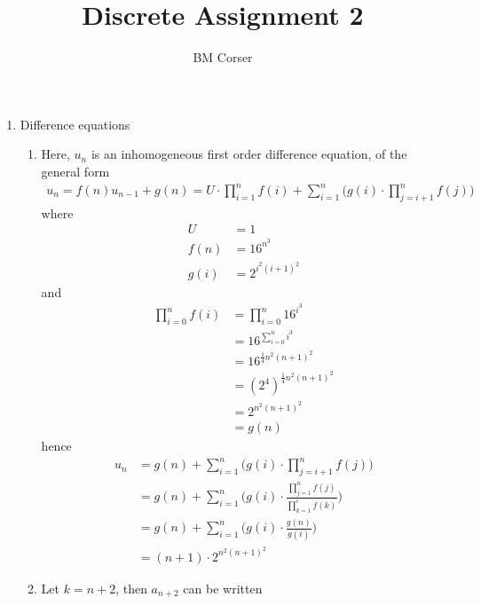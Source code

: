 \documentclass[10pt]{article}
\author{BM Corser}
\title{Discrete Assignment 2}
\begin{document}
    \maketitle 
    \begin{enumerate}
        \item Difference equations
        \begin{enumerate}
            \item Here, $u_n$ is an inhomogeneous first order difference
                equation, of the general form
                \begin{align*}
                    u_n = f(n)u_{n - 1} + g(n)
                        = U \cdot \prod_{i = 1}^n f(i) + \sum_{i = 1}^n\Bigg(g(i) \cdot \prod_{j = i + 1}^n f(j) \Bigg)
                \end{align*}
                where
                \begin{align*}
                    U &= 1 \\
                    f(n) &= 16^{n^3} \\
                    g(i) &= 2^{i^2(i + 1)^2}
                \end{align*}
                and
                \begin{align*}
                    \prod_{i = 0}^nf(i) &= \prod_{i = 0}^n16^{i^3} \\
                     &= 16^{\sum_{i = 0}^ni^3} \\
                     &= 16^{\frac{1}{4}n^2(n + 1)^2} \\
                     &= (2^4)^{\frac{1}{4}n^2(n + 1)^2} \\
                     &= 2^{n^2(n + 1)^2} \\
                     &= g(n)
                \end{align*}
                hence
                \begin{align*}
                    u_n &= g(n) + \sum_{i = 1}^n\Bigg(g(i) \cdot \prod_{j = i + 1}^n f(j) \Bigg) \\
                    &= g(n) + \sum_{i = 1}^n\Bigg(g(i) \cdot \frac{\prod_{j = 1}^n f(j)}{\prod_{k = 1}^i f(k)} \Bigg) \\
                    &= g(n) + \sum_{i = 1}^n\Bigg(g(i) \cdot \frac{g(n)}{g(i)} \Bigg) \\
                    &= (n + 1)\cdot 2^{n^2(n + 1)^2}
                \end{align*}
            \item Let $k = n + 2$, then $a_{n + 2}$ can be written

\end{enumerate}
\end{enumerate}
\end{document}
